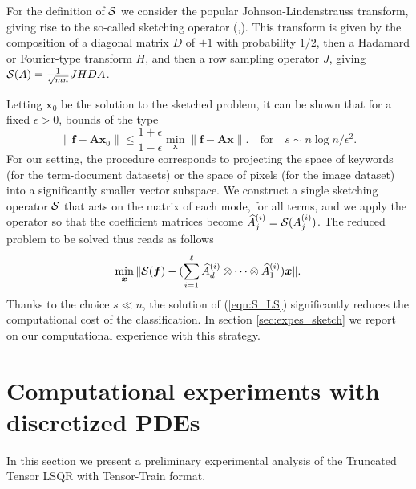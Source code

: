\documentclass{siamart190516}
\newcommand{\bx}{\bm x}
\begin{document}
For the definition of $\cal S$ we consider the
popular Johnson-Lindenstrauss transform, giving
rise to the so-called sketching operator 
(\cite{woodruff2014sketching},\cite{martinsson_tropp_2020}).
This transform is given
by the composition of a diagonal matrix $D$ of $\pm 1$ with probability $1/2$,
then a Hadamard or Fourier-type transform $H$, and then a row sampling operator $J$,
giving
${\cal S}(A) = \frac 1 {\sqrt{mn}} J H D A$.

Letting $\bx_0$ be the solution to the sketched problem,
it can be shown \cite{martinsson_tropp_2020} that for a fixed $\epsilon>0$, bounds of the type
$$
\|\bm f - {\mathcal {\bm A}} \bx_0\| \le \frac{1+\epsilon}{1-\epsilon} 
\min_{\bx} \|\bm f - {\mathcal {\bm A}}  \bx\|. \quad\mbox{for}\quad
s\sim n \log n / \epsilon^2 .
$$
For our setting, the procedure corresponds to projecting the 
space of keywords (for the term-document datasets) or the space of
pixels (for the image dataset) into a significantly smaller vector subspace.
We construct a single sketching operator $\cal S$ that acts on the matrix
of each mode, for all terms, and we apply the operator so that
the coefficient matrices become $\widehat A_j^{(i)} = {\cal S}(A_j^{(i)})$.
The reduced problem to be solved thus reads as follows 
\begin{equation}\label{eqn:S_LS}
\min_{\bx} \|{\cal S} (\bm f) - (\sum_{i=1}^\ell {\widehat A}_d^{(i)}\otimes \cdots
\otimes {\widehat A}_1^{(i)}) \bx\| .
\end{equation}
Thanks to the choice $s\ll n$, the solution of (\ref{eqn:S_LS}) significantly reduces the computational cost of
the classification. In section \ref{sec:expes_sketch} we report on our
computational experience with this strategy.

\section{Computational experiments with discretized PDEs}\label{sec:sanity}
In this section we present a preliminary experimental analysis of the Truncated Tensor LSQR with Tensor-Train format. 
\end{document}
